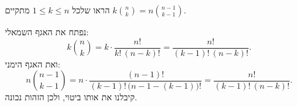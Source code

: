 הראו שלכל $1\le k\le n$ מתקיים $k\binom nk=n\binom{n-1}{k-1}$.
\begin{solbox}
נפתח את האגף השמאלי:
\[
k\binom nk=k\cdot\frac{n!}{k!\,(n-k)!}=\frac{n!}{(k-1)!\,(n-k)!}.
\]
ואת האגף הימני:
\[
n\binom{n-1}{k-1}=n\cdot\frac{(n-1)!}{(k-1)!\,\big(n-1-(k-1)\big)!}=\frac{n!}{(k-1)!\,(n-k)!}.
\]
קיבלנו את אותו ביטוי, ולכן הזהות נכונה.
\end{solbox}
